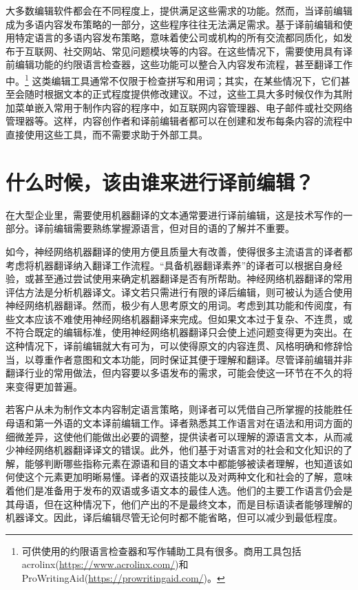\documentclass[output=paper,colorlinks,citecolor=brown]{langscibook}
\begin{document}
\largerpage
大多数编辑软件都会在不同程度上，提供满足这些需求的功能。然而，当译前编辑成为多语内容发布策略的一部分，这些程序往往无法满足需求。基于译前编辑和使用特定语言的多语内容发布策略，意味着使公司或机构的所有交流都同质化，如发布于互联网、社交网站、常见问题模块等的内容。在这些情况下，需要使用具有译前编辑功能的约限语言检查器，这些功能可以整合入内容发布流程，甚至翻译工作中。\footnote{可供使用的约限语言检查器和写作辅助工具有很多。商用工具包括acrolinx(\url{https://www.acrolinx.com/})和ProWritingAid(\url{https://prowritingaid.com/})。} 这类编辑工具通常不仅限于检查拼写和用词；其实，在某些情况下，它们甚至会随时根据文本的正式程度提供修改建议。不过，这些工具大多时候仅作为其附加菜单嵌入常用于制作内容的程序中，如互联网内容管理器、电子邮件或社交网络管理器等。这样，内容创作者和译前编辑者都可以在创建和发布每条内容的流程中直接使用这些工具，而不需要求助于外部工具。

\section{什么时候，该由谁来进行译前编辑？} 

在大型企业里，需要使用机器翻译的文本通常要进行译前编辑，这是技术写作的一部分。译前编辑需要熟练掌握源语言，但对目的语的了解并不重要。

如今，神经网络机器翻译的使用方便且质量大有改善，使得很多主流语言的译者都考虑将机器翻译纳入翻译工作流程。“具备机器翻译素养”的译者\citep{BowkerCiro2019}可以根据自身经验，或甚至通过尝试使用来确定机器翻译是否有所帮助。神经网络机器翻译的常用评估方法是分析机器译文。译文若只需进行有限的译后编辑，则可被认为适合使用神经网络机器翻译。然而，极少有人思考原文的用词。考虑到其功能和传阅度，有些文本应该不难使用神经网络机器翻译来完成。但如果文本过于复杂、不连贯，或不符合既定的编辑标准，使用神经网络机器翻译只会使上述问题变得更为突出。在这种情况下，译前编辑就大有可为，可以使得原文的内容连贯、风格明确和修辞恰当，以尊重作者意图和文本功能，同时保证其便于理解和翻译。尽管译前编辑并非翻译行业的常用做法，但内容要以多语发布的需求，可能会使这一环节在不久的将来变得更加普遍。

若客户从未为制作文本内容制定语言策略，则译者可以凭借自己所掌握的技能胜任母语和第一外语的文本译前编辑工作。译者熟悉其工作语言对在语法和用词方面的细微差异，这使他们能做出必要的调整，提供读者可以理解的源语言文本，从而减少神经网络机器翻译译文的错误。此外，他们基于对语言对的社会和文化知识的了解，能够判断哪些指称元素在源语和目的语文本中都能够被读者理解，也知道该如何使这个元素更加明晰易懂。译者的双语技能以及对两种文化和社会的了解，意味着他们是准备用于发布的双语或多语文本的最佳人选。他们的主要工作语言仍会是其母语，但在这种情况下，他们产出的不是最终文本，而是目标语读者能够理解的机器译文。因此，译后编辑尽管无论何时都不能省略，但可以减少到最低程度。
\end{document}
